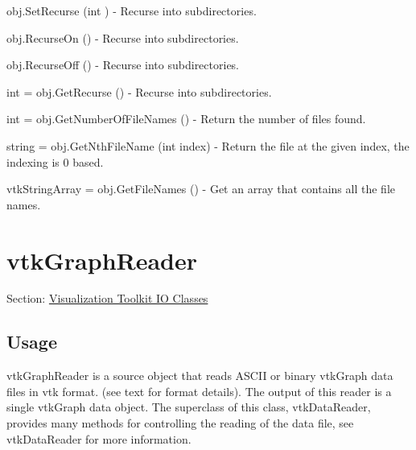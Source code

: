 \begin{DoxyItemize}
\item {\ttfamily obj.\-Set\-Recurse (int )} -\/ Recurse into subdirectories.  
\item {\ttfamily obj.\-Recurse\-On ()} -\/ Recurse into subdirectories.  
\item {\ttfamily obj.\-Recurse\-Off ()} -\/ Recurse into subdirectories.  
\item {\ttfamily int = obj.\-Get\-Recurse ()} -\/ Recurse into subdirectories.  
\item {\ttfamily int = obj.\-Get\-Number\-Of\-File\-Names ()} -\/ Return the number of files found.  
\item {\ttfamily string = obj.\-Get\-Nth\-File\-Name (int index)} -\/ Return the file at the given index, the indexing is 0 based.  
\item {\ttfamily vtk\-String\-Array = obj.\-Get\-File\-Names ()} -\/ Get an array that contains all the file names.  
\end{DoxyItemize}\hypertarget{vtkio_vtkgraphreader}{}\section{vtk\-Graph\-Reader}\label{vtkio_vtkgraphreader}
Section\-: \hyperlink{sec_vtkio}{Visualization Toolkit I\-O Classes} \hypertarget{vtkwidgets_vtkxyplotwidget_Usage}{}\subsection{Usage}\label{vtkwidgets_vtkxyplotwidget_Usage}
vtk\-Graph\-Reader is a source object that reads A\-S\-C\-I\-I or binary vtk\-Graph data files in vtk format. (see text for format details). The output of this reader is a single vtk\-Graph data object. The superclass of this class, vtk\-Data\-Reader, provides many methods for controlling the reading of the data file, see vtk\-Data\-Reader for more information.

